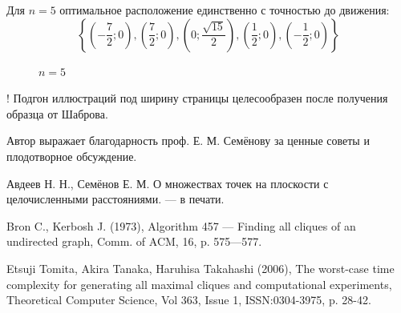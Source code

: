\documentclass{article}
\begin{document}
Для $n=5$ оптимальное расположение единственно с точностью до движения:
$$
\left\{\left( -\frac{7}{2} ; 0\right),\left( \frac{7}{2} ; 0\right),\left( 0 ; \frac{\sqrt{15}}{2}\right),\left( \frac{1}{2} ; 0\right),\left( -\frac{1}{2} ; 0\right)\right\}
$$


\begin{figure}[h]
\caption{$n=5$}
\label{ris:image}
\end{figure}


! Подгон иллюстраций под ширину страницы целесообразен после получения образца от Шаброва.

Автор выражает благодарность проф. Е. М. Семёнову за ценные советы и плодотворное обсуждение.




\newpage

\begin{thebibliography}{99}

 Авдеев Н. Н., Семёнов Е. М. О множествах точек на плоскости с целочисленными расстояниями. --- в печати.

 Bron C., Kerbosh J. (1973), Algorithm 457 — Finding all cliques of an undirected graph, Comm. of ACM, 16, p. 575—577.

 Etsuji Tomita, Akira Tanaka, Haruhisa Takahashi (2006), The worst-case time complexity for generating all maximal cliques and computational experiments, Theoretical Computer Science, Vol 363, Issue 1, ISSN:0304-3975, p. 28-42.

\end{thebibliography}














\end{document}
